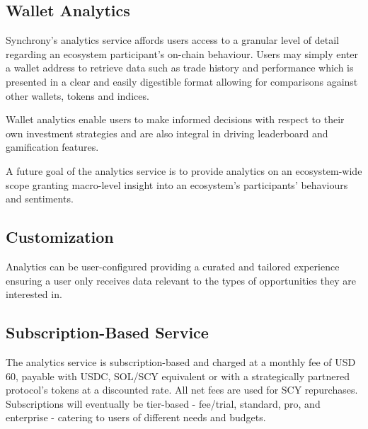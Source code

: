 \documentclass[10pt]{article}
\begin{document}
					\subsection{Wallet Analytics}
					Synchrony's analytics service affords users access to a granular level of detail
					regarding an ecosystem participant's on-chain behaviour. Users may simply enter
					a wallet address to retrieve data such as trade history and performance which is
					presented in a clear and easily digestible format allowing for comparisons
					against other wallets, tokens and indices. 

					Wallet analytics enable users to make
					informed decisions with respect to their own investment strategies and are also
					integral in driving leaderboard and gamification features.

					A future goal of the analytics service is to provide analytics on an
					ecosystem-wide scope granting macro-level insight into an ecosystem's
					participants' behaviours and sentiments.

					\subsection{Customization}
					Analytics can be user-configured providing a curated and tailored experience
					ensuring a user only receives data relevant to the types of opportunities they
					are interested in.

					\subsection{Subscription-Based Service}
					The analytics service is subscription-based and charged at a monthly fee of USD
					60, payable with USDC, SOL/SCY equivalent or with a strategically partnered
					protocol's tokens at a discounted rate. All net fees are used for SCY
					repurchases. Subscriptions will eventually be tier-based - fee/trial, standard,
					pro, and enterprise - catering to users of different needs and budgets.
\end{document}
